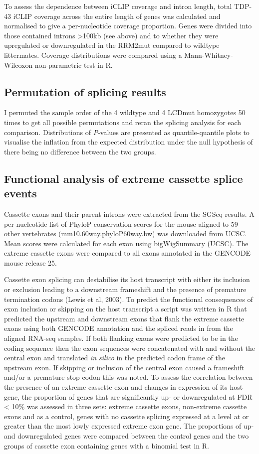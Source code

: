 To assess  the  dependence between  iCLIP  coverage and  intron  length,  total TDP-43  iCLIP  coverage  across  the entire length of genes was calculated and normalised  to give a per-nucleotide coverage proportion. 
Genes were divided into those contained introns >100kb (see above) and to whether they were  upregulated  or  downregulated in  the RRM2mut compared  to wildtype littermates.  
Coverage distributions were compared using a Mann-Whitney-Wilcoxon non-parametric test in R.

\subsection{Permutation of splicing results}
I permuted the sample order of the 4 wildtype and 4 LCDmut homozygotes 50 times to get all possible permutations and reran the splicing analysis for each comparison. 
Distributions of \textit{P}-values are presented as quantile-quantile plots to visualise the inflation from the expected distribution under the null hypothesis of there being no difference between the two groups. 

\subsection{Functional analysis of extreme cassette splice events}
Cassette exons and their parent introns were extracted from the SGSeq results.
A per-nucleotide list of  PhyloP  conservation  scores \citep{Pollard2010-fj} for  the mouse  aligned  to  59  other  vertebrates (mm10.60way.phyloP60way.bw) was downloaded from UCSC. 
Mean scores were calculated for each exon  using  bigWigSummary  (UCSC). 
The  extreme  cassette  exons  were  compared  to  all  exons annotated in the GENCODE mouse release 25. 

Cassette exon splicing can destabilise its host transcript with either its inclusion or exclusion leading to a downstream frameshift and the presence of premature termination codons (Lewis et al, 2003). 
To predict the functional consequences of exon inclusion or skipping on the host transcript a script was written in R that predicted the upstream and downstream exons that  flank the extreme cassette exons using both GENCODE annotation and the spliced reads in from the aligned RNA-seq samples. 
If both flanking exons were predicted to be in the coding sequence then the exon sequences were concatenated with and without the central exon and translated \textit{in silico} in the predicted codon frame of the upstream exon. 
If skipping or inclusion of the central exon caused a frameshift and/or a premature stop codon this was noted. 
To  assess  the  correlation  between  the  presence  of  an  extreme  cassette  exon  and  changes  in expression of its host gene, the proportion of genes that are significantly up- or downregulated at FDR < 10\% was assessed in three sets:
extreme cassette exons, non-extreme cassette exons and as a control, genes with no cassette splicing expressed at a level at or greater than the most lowly expressed extreme exon gene. 
The proportions of up- and downregulated genes were compared between  the control genes and the two groups of cassette exon containing genes with a binomial test in R.   


